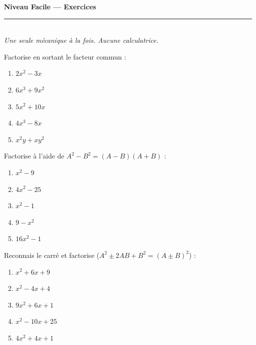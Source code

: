 \documentclass[11pt,a4paper]{article}
\begin{document}
\begin{center}
{\LARGE\bfseries\color{primarydark} Niveau Facile — Exercices}\\[2pt]
{\color{primary}\rule{0.45\textwidth}{1.2pt}}\\[3pt]
{\small\itshape Une seule mécanique à la fois. Aucune calculatrice.}
\end{center}
\vspace{1mm}

\begin{exo}
Factorise en sortant le facteur commun :
\begin{enumerate}[label=\alph*),leftmargin=2em,topsep=1pt,itemsep=1pt]
  \item $2x^{2}-3x$ \qquad
  \item $6x^{3}+9x^{2}$ \qquad
  \item $5x^{2}+10x$ \qquad
  \item $4x^{3}-8x$ \qquad
  \item $x^{2}y+xy^{2}$
\end{enumerate}
\end{exo}

\begin{exo}
Factorise à l'aide de $A^{2}-B^{2}=(A-B)(A+B)$ :
\begin{enumerate}[label=\alph*),leftmargin=2em,topsep=1pt,itemsep=1pt]
  \item $x^{2}-9$ \qquad
  \item $4x^{2}-25$ \qquad
  \item $x^{2}-1$ \qquad
  \item $9-x^{2}$ \qquad
  \item $16x^{2}-1$
\end{enumerate}
\end{exo}

\begin{exo}
Reconnais le carré et factorise ($A^{2}\pm2AB+B^{2}=(A\pm B)^{2}$) :
\begin{enumerate}[label=\alph*),leftmargin=2em,topsep=1pt,itemsep=1pt]
  \item $x^{2}+6x+9$ \qquad
  \item $x^{2}-4x+4$ \qquad
  \item $9x^{2}+6x+1$ \qquad
  \item $x^{2}-10x+25$ \qquad
  \item $4x^{2}+4x+1$
\end{enumerate}
\end{exo}
\end{document}
